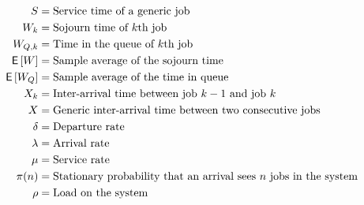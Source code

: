 \begin{align*}
 S &= \text{Service time of a generic job} \\
 W_k &= \text{Sojourn time of $k$th job} \\
 W_{Q,k} &= \text{Time in the queue of $k$th job} \\
 \,\mathsf{E}\left[W\right] &= \text{Sample average of the sojourn time} \\
 \,\mathsf{E}\left[W_Q\right] &= \text{Sample average of the time in queue} \\
 X_k &= \text{Inter-arrival time between job $k-1$ and job $k$} \\
 X &= \text{Generic inter-arrival time between two consecutive jobs} \\
 \delta &= \text{Departure rate} \\
 \lambda &= \text{Arrival rate} \\
 \mu &= \text{Service rate} \\
 \pi(n) &= \text{Stationary probability that an arrival sees $n$ jobs in the system} \\
 \rho &= \text{Load on the system} \\
\end{align*}
